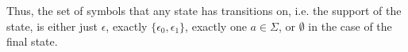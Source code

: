Thus, the set of symbols that any state has transitions on, i.e. the support of
the state, is either just $\epsilon$, exactly $\{\epsilon_0, \epsilon_1\}$,
exactly one $a \in \Sigma$, or $\emptyset$ in the case of the final
state. %





